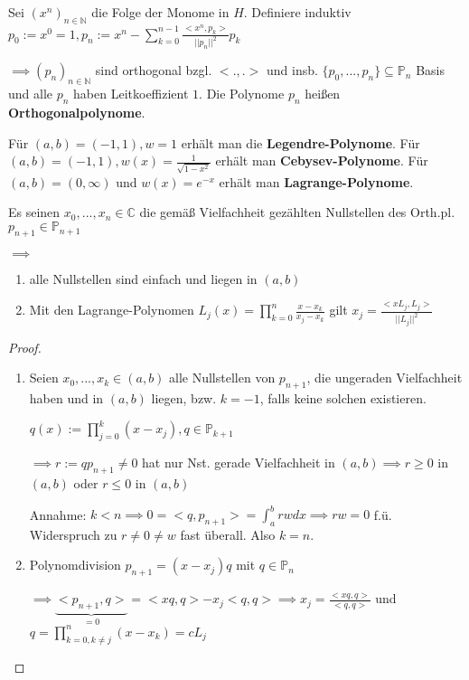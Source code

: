 \begin{lemma}
	Sei $(x^n)_{n \in \mathbb{N}}$ die Folge der Monome in $H$. Definiere induktiv $p_0 := x^0 = 1, p_n := x^n - \sum_{k=0}^{n-1} \frac{<x^n, p_k>}{||p_n||^2} p_k$
	
	$\implies (p_n)_{n\in \mathbb{N}}$ sind orthogonal bzgl. $<., .>$ und insb. $\{p_0, ..., p_n\} \subseteq \mathbb{P}_n$ Basis und alle $p_n$ haben Leitkoeffizient $1$. Die Polynome $p_n$ heißen \textbf{Orthogonalpolynome}.
\end{lemma}

\begin{remark}
	Für $(a,b) = (-1, 1), w=1$ erhält man die \textbf{Legendre-Polynome}. Für $(a,b)=(-1, 1), w(x)=\frac{1}{\sqrt{1-x^2}}$ erhält man \textbf{Cebysev-Polynome}. Für $(a,b)=(0, \infty)$ und $w(x)=e^{-x}$ erhält man \textbf{Lagrange-Polynome}.
\end{remark}

\begin{lemma}
	Es seinen $x_0, ..., x_n \in \mathbb{C}$ die gemäß Vielfachheit gezählten Nullstellen des Orth.pl. $p_{n+1} \in \mathbb{P}_{n+1}$
	
	$\implies$
	\begin{enumerate}
		\item alle Nullstellen sind einfach und liegen in $(a,b)$
		\item Mit den Lagrange-Polynomen $L_j(x) = \prod_{k=0}^{n} \frac{x-x_k}{x_j - x_k}$ gilt $x_j = \frac{<xL_j, L_j>}{||L_j||^2}$
	\end{enumerate}
\end{lemma}

\begin{proof}
	\begin{enumerate}
		\item Seien $x_0, ..., x_k \in (a,b)$ alle Nullstellen von $p_{n+1}$, die ungeraden Vielfachheit haben und in $(a,b)$ liegen, bzw. $k=-1$, falls keine solchen existieren.
		
		$q(x) := \prod_{j=0}^{k} (x-x_j), q \in \mathbb{P}_{k+1}$
		
		$\implies r := q p_{n+1} \neq 0$ hat nur Nst. gerade Vielfachheit in $(a,b) \implies r \geq 0$ in $(a,b)$ oder $r \leq 0$ in $(a,b)$
		
		Annahme: $k < n \implies 0 = <q, p_{n+1}> = \int_{a}^{b} rw dx \implies rw = 0$ f.ü. Widerspruch zu $r \neq 0 \neq w$ fast überall. Also $k=n$.
		
		\item Polynomdivision $p_{n+1} = (x-x_j)q$ mit $q \in \mathbb{P}_n$
		
		$\implies \underbrace{<p_{n+1}, q>}_{=0} = <xq,q> - x_j <q,q> \implies x_j = \frac{<xq,q>}{<q,q>}$ und $q = \prod_{k=0, k\neq j}^{n} (x-x_k) = cL_j$
	\end{enumerate}
\end{proof}

